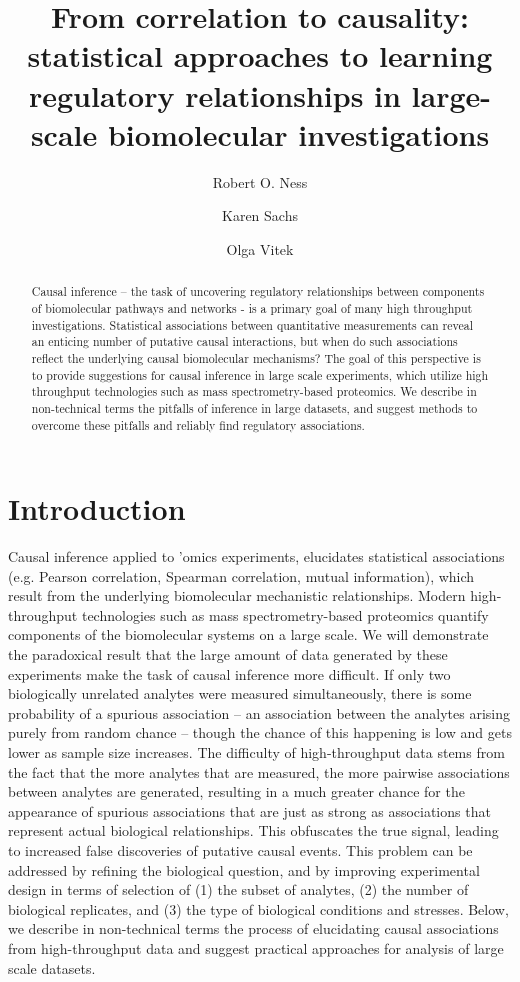 \documentclass[journal=jacsat,manuscript=article]{achemso}
\author{Robert O. Ness}
\affiliation[Purdue University]{Purdue University Department of Statistics, West Lafayette}
\affiliation[Northeastern University]{College of Science, College of Computer and Information Science, Northeastern University, Boston}
\author{Karen Sachs}
\affiliation[Stanford University]{School of Medicine, Stanford University, Palo Alto}
\author{Olga Vitek}
\affiliation[Northeastern University]{College of Science, College of Computer and Information Science, Northeastern University, Boston}
\title[]
   {From correlation to causality: statistical approaches to learning regulatory relationships in large-scale biomolecular investigations}
\begin{document}
\begin{abstract}
  Causal inference -- the task of uncovering regulatory relationships between components of biomolecular pathways and networks - is a primary goal of many high throughput investigations.  Statistical associations between quantitative measurements can reveal an enticing number of putative causal interactions, but when do such associations reflect the underlying causal biomolecular mechanisms?  The goal of this perspective is to provide suggestions for causal inference in large scale experiments, which utilize high throughput technologies such as mass spectrometry-based proteomics.  We describe in non-technical terms the pitfalls of inference in large datasets, and suggest methods to overcome these pitfalls and reliably find regulatory associations.
\end{abstract}

\section{Introduction}

Causal inference \cite{pearl2009causality} applied to 'omics experiments, elucidates statistical associations (e.g. Pearson correlation, Spearman correlation, mutual information), which result from the underlying biomolecular mechanistic relationships. Modern high-throughput technologies such as mass spectrometry-based proteomics quantify components of the biomolecular systems on a large scale. We will demonstrate the paradoxical result that the large amount of data generated by these experiments make the task of causal inference more difficult.  If only two biologically unrelated analytes were measured simultaneously, there is some probability of a spurious association -- an association between the analytes arising purely from random chance -- though the chance of this happening is low and gets lower as sample size increases. The difficulty of high-throughput data stems from the fact that the more analytes that are measured, the more pairwise associations between analytes are generated, resulting in a much greater chance for the appearance of spurious associations that are just as strong as associations that represent actual biological relationships.  This obfuscates the true signal, leading to increased false discoveries of putative causal events.  This problem can be addressed by refining the biological question, and by improving experimental design in terms of selection of  (1) the subset of analytes, (2) the number of biological replicates, and (3) the type of biological conditions and stresses. Below, we describe in non-technical terms the process of elucidating causal associations from high-throughput data and suggest practical approaches for analysis of large scale datasets. 
\end{document}

